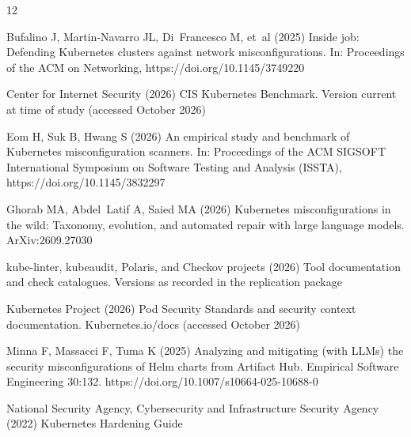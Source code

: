 \documentclass[pdflatex,sn-basic]{sn-jnl}
\begin{document}
\begin{thebibliography}{12}
\providecommand{\natexlab}[1]{#1}
\providecommand{\url}[1]{{#1}}
\providecommand{\urlprefix}{URL }
\providecommand{\doi}[1]{\url{https://doi.org/#1}}
\providecommand{\eprint}[2][]{\url{#2}}
 \bibcommenthead

Bufalino J, Martin-Navarro JL, Di~Francesco M, et~al (2025) Inside job:
  Defending {Kubernetes} clusters against network misconfigurations. In:
  Proceedings of the ACM on Networking, \doi{10.1145/3749220}

{Center for Internet Security} (2026) {CIS Kubernetes Benchmark}. Version
  current at time of study (accessed October 2026)

Eom H, Suk B, Hwang S (2026) An empirical study and benchmark of {Kubernetes}
  misconfiguration scanners. In: Proceedings of the ACM SIGSOFT International
  Symposium on Software Testing and Analysis (ISSTA), \doi{10.1145/3832297}

Ghorab MA, Abdel~Latif A, Saied MA (2026) Kubernetes misconfigurations in the
  wild: Taxonomy, evolution, and automated repair with large language models.
  ArXiv:2609.27030

{kube-linter, kubeaudit, Polaris, and Checkov projects} (2026) Tool
  documentation and check catalogues. Versions as recorded in the replication
  package

{Kubernetes Project} (2026) {Pod Security Standards} and security context
  documentation. Kubernetes.io/docs (accessed October 2026)

Minna F, Massacci F, Tuma K (2025) Analyzing and mitigating (with {LLMs}) the
  security misconfigurations of {Helm} charts from {Artifact Hub}. Empirical
  Software Engineering 30:132. \doi{10.1007/s10664-025-10688-0}

{National Security Agency}, {Cybersecurity and Infrastructure Security Agency}
  (2022) {Kubernetes Hardening Guide}


\end{thebibliography}
\end{document}
